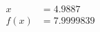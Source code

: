 \documentclass[preview]{standalone}
\begin{document}
\begin{align*}
x &= 4.9887\\f(x) &= 7.9999839
\end{align*}
\end{document}
